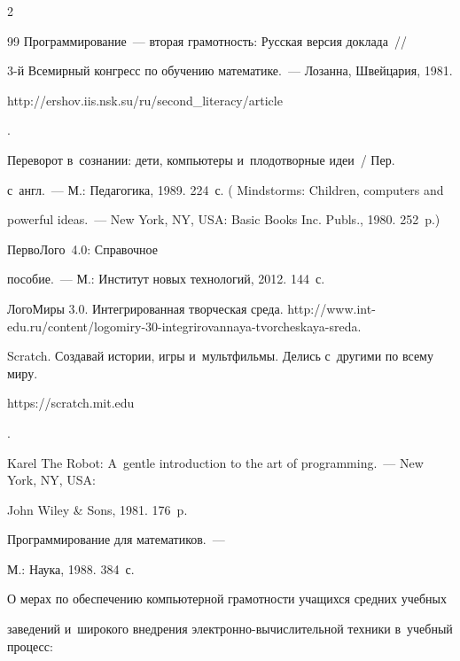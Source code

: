 \begin{multicols}{2}
{{\begin{thebibliography}{99}
   Программирование~--- вторая грамотность: Русская версия доклада~// 


3-й Всемирный конгресс по обучению математике.~--- Лозанна,  Швейцария, 1981. {\sf 


http://ershov.iis.nsk.su/ru/\linebreak second\_literacy/article}. 




   Переворот в~сознании: дети, компьютеры и~плодотворные идеи~/ Пер. 


  с~англ.~--- М.: Педагогика, 1989. 224~с. ( Mindstorms: Children, computers and 


powerful ideas.~--- New York, NY, USA: Basic Books Inc. Publs., 1980. 252~p.)




   ПервоЛого~4.0: Справочное 


пособие.~--- М.: Институт новых технологий, 2012. 144~с.


\pagebreak







  ЛогоМиры 3.0. Интегрированная творческая среда. {\sf http://www.int-edu.ru/content/logomiry-30-integrirovannaya-tvorcheskaya-sreda}.




    Scratch. Создавай истории, игры и~мультфильмы. Делись с~другими по всему миру. {\sf 


https://scratch.mit.edu}.




   Karel The Robot: A~gentle introduction to the art of programming.~---  New York, NY, USA: 


John Wiley \& Sons, 1981. 176~p. 




   Программирование для математиков.~--- 


М.: Наука, 1988. 384~с.




  О мерах по обеспечению компьютерной грамот\-ности учащихся средних учебных 


заведений и~широкого внедрения электронно-вычислительной техники в~учебный процесс: 



\end{thebibliography}}}
\end{multicols}
